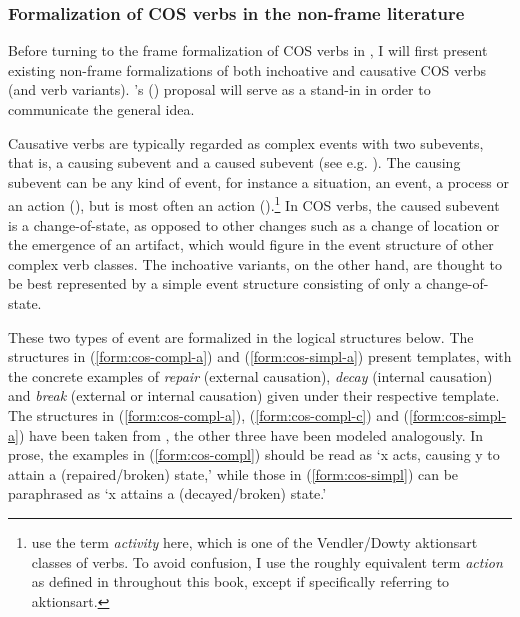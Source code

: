 \subsubsection{{Formalization of COS verbs in the non-frame literature}}
\label{sec:cos-prev-formal}

Before turning to the frame formalization of COS verbs in , I will first present existing non-frame formalizations of both inchoative and causative COS verbs (and verb variants). \citeauthor{RappaportHovav.1998}'s (\citeyear{RappaportHovav.1998}) proposal will serve as a stand-in in order to communicate the general idea.

Causative verbs are typically regarded as complex events with two subevents, that is, a causing subevent and a caused subevent (see e.g. \citealt{Dowty.1979,Levin.1995,Pustejovsky.1991}). The causing subevent can be any kind of event, for instance a situation, an event, a process or an action (\citealt[84]{VanValinJr.1997}), but is most often an action (\citealt[104]{RappaportHovav.1998}).\footnote{\citet{RappaportHovav.1998} use the term \textit{activity} here, which is one of the Vendler/Dowty aktionsart classes of verbs. To avoid confusion, I use the roughly equivalent term \textit{action} as defined in  throughout this book, except if specifically referring to aktionsart.} 
In COS verbs, the caused subevent is a change-of-state, as opposed to other changes such as a change of location or the emergence of an artifact, which would figure in the event structure of other complex verb classes. The inchoative variants, on the other hand, are thought to be best represented by a simple event structure consisting of only a change-of-state. 

These two types of event are formalized in the logical structures below. The structures in (\ref{form:cos-compl-a}) and (\ref{form:cos-simpl-a}) present templates, with the concrete examples of \textit{repair} (external causation), \textit{decay} (internal causation) and \textit{break} (external or internal causation) given under their respective template.
The structures in (\ref{form:cos-compl-a}), (\ref{form:cos-compl-c}) and (\ref{form:cos-simpl-a}) have been taken from \citet{RappaportHovav.1998}, the other three have been modeled analogously. In prose, the examples in (\ref{form:cos-compl}) should be read as `x acts, causing y to attain a (repaired/broken) state,' while those in (\ref{form:cos-simpl}) can be paraphrased as `x attains a (decayed/broken) state.'

